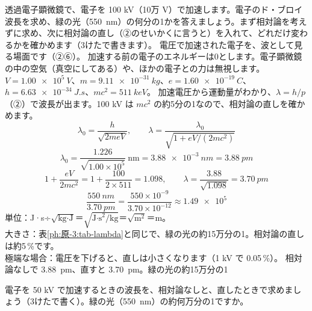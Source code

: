 \label{ph:原-3:ex1}
\begin{phreidai}
透過電子顕微鏡で、電子を 100 kV（10万 V）で加速します。電子のド・ブロイ波長を求め、緑の光（\qty{550}{nm}）の何分の1かを答えましょう。まず相対論を考えずに求め、次に相対論の直し（②のせいかくに言うと）を入れて、どれだけ変わるかを確かめます（3けたで書きます）。
\phbamen
電圧で加速された電子を、波として見る場面です（②⑥）。
\phmushi
加速する前の電子のエネルギーは0とします。電子顕微鏡の中の空気（真空にしてある）や、ほかの電子との力は無視します。
\phzu
$V=\qty{1.00e5}{V}$、$m=\qty{9.11e-31}{kg}$、$e=\qty{1.60e-19}{C}$、\\
$h=\qty{6.63e-34}{J.s}$、$mc^2=\qty{511}{keV}$。
\phriyu
加速電圧から運動量がわかり、$\lambda=h/p$（②）で波長が出ます。100 kV は $mc^2$ の約5分の1なので、相対論の直しを確かめます。
\phtateru
\[ \lambda_0=\frac{h}{\sqrt{2meV}},\qquad \lambda=\frac{\lambda_0}{\sqrt{1+eV/(2mc^2)}} \]
\phtoku
\[ \lambda_0=\frac{1.226}{\sqrt{1.00\times10^5}}\ \mathrm{nm}=\qty{3.88e-3}{nm}=\qty{3.88}{pm} \]
\[ 1+\frac{eV}{2mc^2}=1+\frac{100}{2\times511}=1.098,\qquad \lambda=\frac{3.88}{\sqrt{1.098}}=\qty{3.70}{pm} \]
\[ \frac{\qty{550}{nm}}{\qty{3.70}{pm}}=\frac{550\times10^{-9}}{3.70\times10^{-12}}\approx\num{1.49e5} \]
\phtashikame
単位：J·s÷$\sqrt{\text{kg·J}}$＝$\sqrt{\text{J·s}^2/\text{kg}}$＝$\sqrt{\text{m}^2}$＝m。\\
大きさ：表\ref{ph:原-3:tab-lambda}と同じで、緑の光の約15万分の1。相対論の直しは約5\,\%です。\\
極端な場合：電圧を下げると、直しは小さくなります（1 kV で 0.05\,\%）。
\kotae 相対論なしで \qty{3.88}{pm}、直すと \qty{3.70}{pm}。緑の光の約15万分の1
\end{phreidai}
\begin{jibun}
電子を 50 kV で加速するときの波長を、相対論なしと、直したときで求めましょう（3けたで書く）。緑の光（\qty{550}{nm}）の約何万分の1ですか。
\end{jibun}

